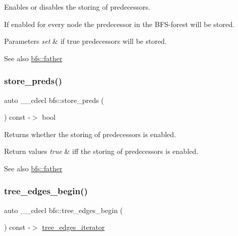 Enables or disables the storing of predecessors. 

If enabled for every node the predecessor in the B\+F\+S-\/forest will be stored.


\begin{DoxyParams}{Parameters}
{\em set} & if true predecessors will be stored. \\
\hline
\end{DoxyParams}
\begin{DoxySeeAlso}{See also}
\mbox{\hyperlink{classbfs_ab8a8b65048c4ffb6caa7651b793e4e56}{bfs\+::father}} 
\end{DoxySeeAlso}
\mbox{\label{classbfs_add14dde492d4df084198ff2957c9b610}} 
\subsubsection{\texorpdfstring{store\+\_\+preds()}{store\_preds()}\hspace{0.1cm}{\footnotesize\ttfamily [2/2]}}
{\footnotesize\ttfamily auto \+\_\+\+\_\+cdecl bfs\+::store\+\_\+preds (\begin{DoxyParamCaption}{ }\end{DoxyParamCaption}) const -\/$>$ bool \hspace{0.3cm}{\ttfamily [inline]}}



Returns whether the storing of predecessors is enabled. 


\begin{DoxyRetVals}{Return values}
{\em true} & iff the storing of predecessors is enabled. \\
\hline
\end{DoxyRetVals}
\begin{DoxySeeAlso}{See also}
\mbox{\hyperlink{classbfs_ab8a8b65048c4ffb6caa7651b793e4e56}{bfs\+::father}} 
\end{DoxySeeAlso}
\mbox{\label{classbfs_aef8c6f063e1d1e52770f5adf12c7cb28}} 
\subsubsection{\texorpdfstring{tree\+\_\+edges\+\_\+begin()}{tree\_edges\_begin()}}
{\footnotesize\ttfamily auto \+\_\+\+\_\+cdecl bfs\+::tree\+\_\+edges\+\_\+begin (\begin{DoxyParamCaption}{ }\end{DoxyParamCaption}) const -\/$>$ \mbox{\hyperlink{classbfs_aa0b58a03ca2fc32117948ab27a806bd1}{tree\+\_\+edges\+\_\+iterator}}
	\hspace{0.3cm}{\ttfamily [inline]}}



